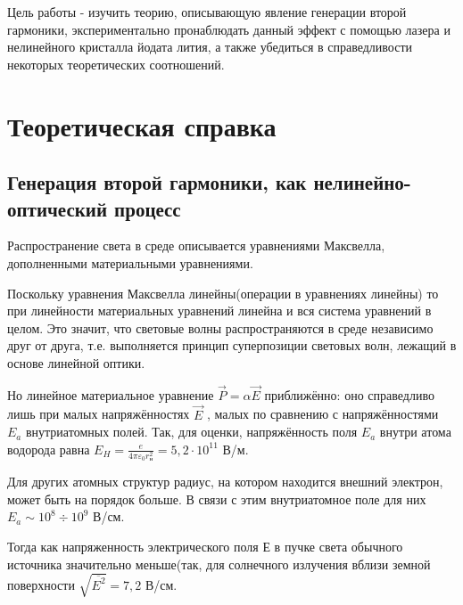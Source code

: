 \documentclass[a4paper,12pt]{article} %
\begin{document}
Цель работы - изучить теорию, описывающую явление генерации второй гармоники, экспериментально пронаблюдать данный эффект с помощью лазера и нелинейного кристалла йодата лития, а также убедиться в справедливости некоторых теоретических соотношений.

\section{Теоретическая справка}
\subsection*{Генерация второй гармоники, как нелинейно-оптический
процесс}
Распространение света в среде описывается уравнениями Максвелла, дополненными материальными уравнениями.

Поскольку уравнения Максвелла линейны(операции в уравнениях линейны) то при линейности материальных уравнений линейна и вся система уравнений в целом. Это
значит, что световые волны распространяются в среде независимо друг
от друга, т.е. выполняется принцип суперпозиции световых волн, лежащий в основе линейной оптики.

Но линейное материальное уравнение $\vec{P} = \alpha \vec{E}$ приближённо: оно
справедливо лишь при малых напряжённостях $\vec{E}$ , малых по сравнению с напряжённостями $E_a$ внутриатомных полей. Так, для оценки, напряжённость поля $E_a$ внутри атома водорода равна $E_H = \frac{e}{4 \pi \varepsilon_{0} r_{\text{н}}^{2}} = 5,2 \cdot 10^{11}$ В/м.

Для других атомных структур радиус, на котором находится внешний электрон, может быть на порядок больше. В связи с этим внутриатомное поле для них $E_a \sim 10^8 \div 10^9$ В/см.

Тогда как напряженность электрического поля Е в пучке света обычного источника значительно меньше(так, для солнечного излучения вблизи земной поверхности $\sqrt{\overline{E^2}} = 7,2$ В/см.
\end{document}
